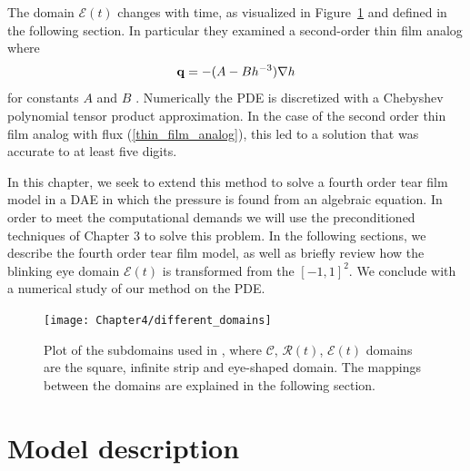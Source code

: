  The domain $\mathcal{E}(t)$ changes with time, as visualized in Figure~\ref{driscoll_eye} and defined in the following section. In particular they examined a second-order thin film analog where
\begin{equation}
\label{thin_film_analog}
\mathbf{q} = -(A-B h^{-3})\nabla h
\end{equation}
for constants $A$ and $B$ \cite{driscoll2018simulation}. Numerically the PDE is discretized with a Chebyshev polynomial tensor product approximation. In the case of the second order thin film analog with flux (\ref{thin_film_analog}), this led to a solution that was accurate to at least five digits.

In this chapter, we seek to extend this method to solve a fourth order tear film model in a DAE in which the pressure  is found from an algebraic equation. In order to meet the computational demands we will use the preconditioned techniques of Chapter 3 to solve this problem. In the following sections, we describe the fourth order tear film model, as well as briefly review how the blinking eye domain $\mathcal{E}(t)$ is transformed from the $[-1,1]^2$. We conclude with a numerical study of our method on the PDE.


\begin{figure}
  \centering
  \texttt{[image: Chapter4/different\_domains]}
  \caption{Plot of the subdomains used in \cite{driscoll2018simulation}, where $\mathcal{C}$, $\mathcal{R}(t)$, $\mathcal{E}(t)$ domains are the square, infinite strip and eye-shaped domain. The mappings between the domains are explained in the following section.}
  \label{driscoll_eye}
\end{figure}
	
\section{Model description}


